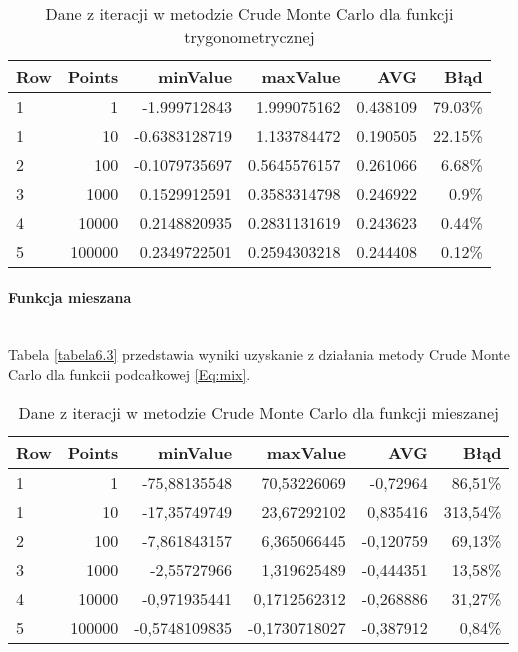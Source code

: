 \documentclass[12pt,twoside]{article}
\begin{document}
\begin{table}[H]
\centering 
\caption{Dane z iteracji w metodzie Crude Monte Carlo dla funkcji trygonometrycznej}
\label{tabela6.2}
\begin{tabular}{lrrrrr}
\toprule
{Row} &  Points &  minValue &  maxValue &       AVG &      Błąd \\
\midrule
1  &     1 & -1.999712843 &   1.999075162 & 0.438109 & 79.03\% \\
1  &     10 & -0.6383128719 &  1.133784472 & 0.190505 & 22.15\% \\
2  &     100 & -0.1079735697 &  0.5645576157 & 0.261066 & 6.68\% \\
3  &     1000 & 0.1529912591 &   0.3583314798 & 0.246922 & 0.9\% \\
4  &     10000 & 0.2148820935 &  0.2831131619 & 0.243623 & 0.44\% \\
5  &     100000 & 0.2349722501 &  0.2594303218 & 0.244408 & 0.12\% \\
\bottomrule
\end{tabular}
\end{table}

\paragraph{Funkcja mieszana}\mbox{} \\

Tabela \eqref{tabela6.3} przedstawia wyniki uzyskanie z działania metody Crude Monte Carlo dla funkcii podcałkowej \eqref{Eq:mix}.


\begin{table}[H]
\centering 
\caption{Dane z iteracji w metodzie Crude Monte Carlo dla funkcji mieszanej}
\label{tabela6.3}
\begin{tabular}{lrrrrr}
\toprule
{Row} &  Points &  minValue &  maxValue &       AVG &      Błąd \\
\midrule
1  &     1 & -75,88135548 &   70,53226069 & -0,72964 & 86,51\% \\
1  &     10 & -17,35749749 &  23,67292102 & 0,835416 & 313,54\% \\
2  &     100 & -7,861843157 &  6,365066445 & -0,120759 & 69,13\% \\
3  &     1000 & -2,55727966 &   1,319625489 & -0,444351 & 13,58\% \\
4  &     10000 & -0,971935441 &  0,1712562312 & -0,268886 & 31,27\% \\
5  &     100000 & -0,5748109835 &  -0,1730718027 & -0,387912 & 0,84\% \\
\bottomrule
\end{tabular}
\end{table}
\end{document}
